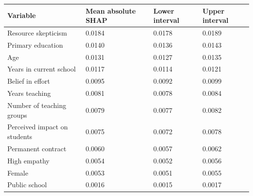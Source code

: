 \begin{tabular}{llll}
\toprule
Variable & Mean absolute SHAP & Lower interval & Upper interval\\
\midrule
Resource skepticism & 0.0184 & 0.0178 & 0.0189\\
Primary education & 0.0140 & 0.0136 & 0.0143\\
Age & 0.0131 & 0.0127 & 0.0135\\
Years in current school & 0.0117 & 0.0114 & 0.0121\\
Belief in effort & 0.0095 & 0.0092 & 0.0099\\
\addlinespace
Years teaching & 0.0081 & 0.0078 & 0.0084\\
Number of teaching groups & 0.0079 & 0.0077 & 0.0082\\
Perceived impact on students & 0.0075 & 0.0072 & 0.0078\\
Permanent contract & 0.0060 & 0.0057 & 0.0062\\
High empathy & 0.0054 & 0.0052 & 0.0056\\
\addlinespace
Female & 0.0053 & 0.0051 & 0.0055\\
Public school & 0.0016 & 0.0015 & 0.0017\\
\bottomrule
\end{tabular}
